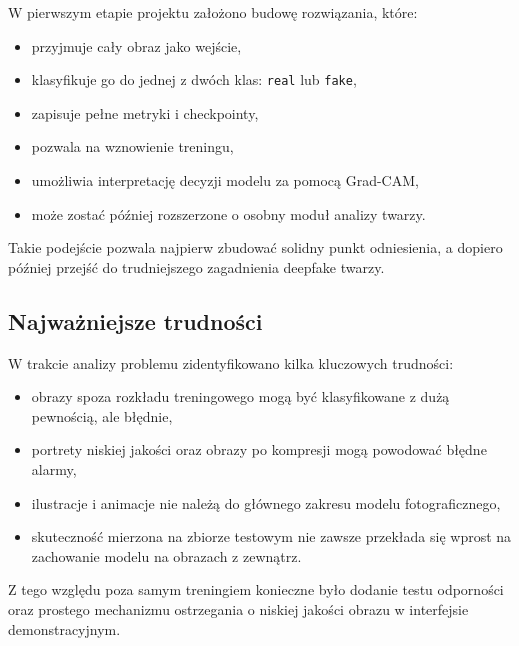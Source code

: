 W pierwszym etapie projektu założono budowę rozwiązania, które:

\begin{itemize}
    \item przyjmuje cały obraz jako wejście,
    \item klasyfikuje go do jednej z dwóch klas: \texttt{real} lub \texttt{fake},
    \item zapisuje pełne metryki i checkpointy,
    \item pozwala na wznowienie treningu,
    \item umożliwia interpretację decyzji modelu za pomocą Grad-CAM,
    \item może zostać później rozszerzone o osobny moduł analizy twarzy.
\end{itemize}

Takie podejście pozwala najpierw zbudować solidny punkt odniesienia, a dopiero później przejść do trudniejszego zagadnienia deepfake twarzy.

\subsection{Najważniejsze trudności}

W trakcie analizy problemu zidentyfikowano kilka kluczowych trudności:

\begin{itemize}
    \item obrazy spoza rozkładu treningowego mogą być klasyfikowane z dużą pewnością, ale błędnie,
    \item portrety niskiej jakości oraz obrazy po kompresji mogą powodować błędne alarmy,
    \item ilustracje i animacje nie należą do głównego zakresu modelu fotograficznego,
    \item skuteczność mierzona na zbiorze testowym nie zawsze przekłada się wprost na zachowanie modelu na obrazach z zewnątrz.
\end{itemize}

Z tego względu poza samym treningiem konieczne było dodanie testu odporności oraz prostego mechanizmu ostrzegania o niskiej jakości obrazu w interfejsie demonstracyjnym.
